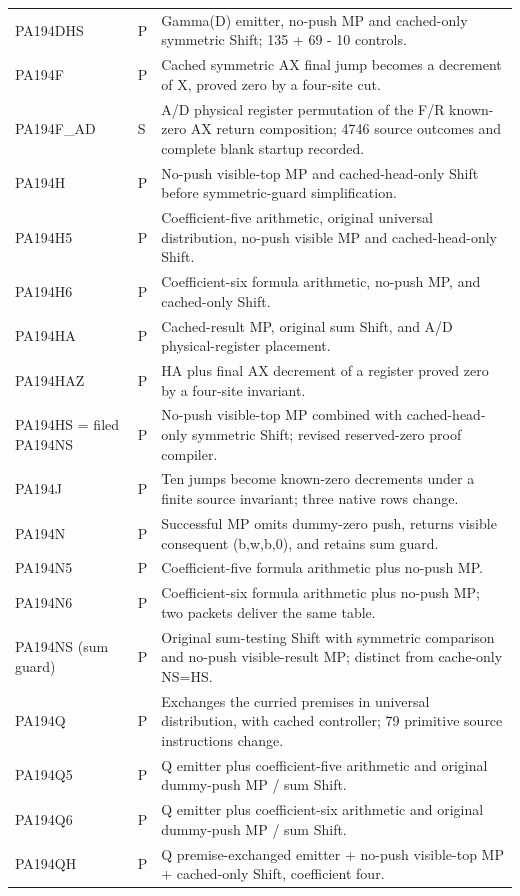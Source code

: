 \begin{longtable}{p{.22\linewidth}p{.06\linewidth}p{.63\linewidth}}
PA194DHS & P & Gamma(D) emitter, no-push MP and cached-only symmetric Shift; 135 + 69 - 10 controls.\\
PA194F & P & Cached symmetric AX final jump becomes a decrement of X, proved zero by a four-site cut.\\
PA194F\_AD & S & A/D physical register permutation of the F/R known-zero AX return composition; 4746 source outcomes and complete blank startup recorded.\\
PA194H & P & No-push visible-top MP and cached-head-only Shift before symmetric-guard simplification.\\
PA194H5 & P & Coefficient-five arithmetic, original universal distribution, no-push visible MP and cached-head-only Shift.\\
PA194H6 & P & Coefficient-six formula arithmetic, no-push MP, and cached-only Shift.\\
PA194HA & P & Cached-result MP, original sum Shift, and A/D physical-register placement.\\
PA194HAZ & P & HA plus final AX decrement of a register proved zero by a four-site invariant.\\
PA194HS = filed PA194NS & P & No-push visible-top MP combined with cached-head-only symmetric Shift; revised reserved-zero proof compiler.\\
PA194J & P & Ten jumps become known-zero decrements under a finite source invariant; three native rows change.\\
PA194N & P & Successful MP omits dummy-zero push, returns visible consequent (b,w,b,0), and retains sum guard.\\
PA194N5 & P & Coefficient-five formula arithmetic plus no-push MP.\\
PA194N6 & P & Coefficient-six formula arithmetic plus no-push MP; two packets deliver the same table.\\
PA194NS (sum guard) & P & Original sum-testing Shift with symmetric comparison and no-push visible-result MP; distinct from cache-only NS=HS.\\
PA194Q & P & Exchanges the curried premises in universal distribution, with cached controller; 79 primitive source instructions change.\\
PA194Q5 & P & Q emitter plus coefficient-five arithmetic and original dummy-push MP / sum Shift.\\
PA194Q6 & P & Q emitter plus coefficient-six arithmetic and original dummy-push MP / sum Shift.\\
PA194QH & P & Q premise-exchanged emitter + no-push visible-top MP + cached-only Shift, coefficient four.\\

\end{longtable}
